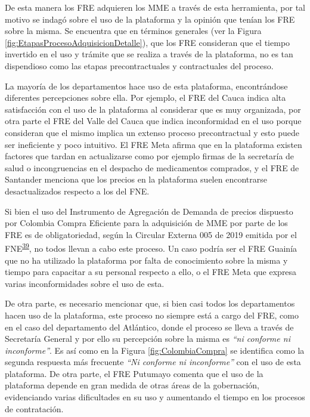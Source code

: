 \documentclass[
]{book}
\begin{document}
De esta manera los FRE adquieren los MME a través de esta herramienta, por tal motivo se indagó sobre el uso de la plataforma y la opinión que tenían los FRE sobre la misma. Se encuentra que en términos generales (ver la Figura \ref{fig:EtapasProcesoAdquisicionDetalle}), que los FRE consideran que el tiempo invertido en el uso y trámite que se realiza a través de la plataforma, no es tan dispendioso como las etapas precontractuales y contractuales del proceso.

La mayoría de los departamentos hace uso de esta plataforma, encontrándose diferentes percepciones sobre ella. Por ejemplo, el FRE del Cauca indica alta satisfacción con el uso de la plataforma al considerar que es muy organizada, por otra parte el FRE del Valle del Cauca que indica inconformidad en el uso porque consideran que el mismo implica un extenso proceso precontractual y esto puede ser ineficiente y poco intuitivo. El FRE Meta afirma que en la plataforma existen factores que tardan en actualizarse como por ejemplo firmas de la secretaría de salud o incongruencias en el despacho de medicamentos comprados, y el FRE de Santander menciona que los precios en la plataforma suelen encontrarse desactualizados respecto a los del FNE.

Si bien el uso del Instrumento de Agregación de Demanda de precios dispuesto por Colombia Compra Eficiente para la adquisición de MME por parte de los FRE es de obligatoriedad, según la Circular Externa 005 de 2019 emitida por el FNE\textsuperscript{\protect\hyperlink{ref-FNE005-2019}{39}}, no todos llevan a cabo este proceso. Un caso podría ser el FRE Guainía que no ha utilizado la plataforma por falta de conocimiento sobre la misma y tiempo para capacitar a su personal respecto a ello, o el FRE Meta que expresa varias inconformidades sobre el uso de esta.

De otra parte, es necesario mencionar que, si bien casi todos los departamentos hacen uso de la plataforma, este proceso no siempre está a cargo del FRE, como en el caso del departamento del Atlántico, donde el proceso se lleva a través de Secretaría General y por ello su percepción sobre la misma es \emph{``ni conforme ni inconforme''}. Es así como en la Figura \ref{fig:ColombiaCompra} se identifica como la segunda respuesta más frecuente \emph{``Ni conforme ni inconforme''} con el uso de esta plataforma. De otra parte, el FRE Putumayo comenta que el uso de la plataforma depende en gran medida de otras áreas de la gobernación, evidenciando varias dificultades en su uso y aumentando el tiempo en los procesos de contratación.
\end{document}
